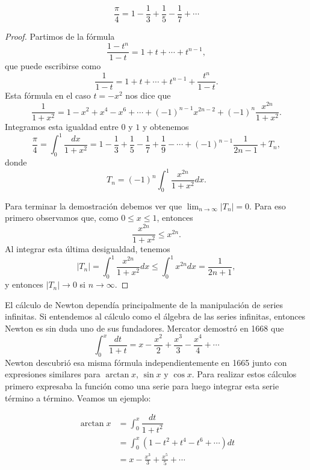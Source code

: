 \begin{theorem}[Leibniz]
	\[
	\frac{\pi}{4}=1-\frac13+\frac15-\frac17+\cdots
	\]
\end{theorem}

\begin{proof}
	Partimos de la fórmula 
	\[
		\frac{1-t^n}{1-t}=1+t+\cdots+t^{n-1},
	\]
	que puede escribirse como
	\[
		\frac{1}{1-t}=1+t+\cdots+t^{n-1}+\frac{t^n}{1-t}.
	\]
	Esta fórmula en el caso $t=-x^2$ nos dice que 
	\[
		\frac{1}{1+x^2}=1-x^2+x^4-x^6+\cdots+(-1)^{n-1}x^{2n-2}+(-1)^n\frac{x^{2n}}{1+x^2}.
	\]
	Integramos esta igualdad entre $0$ y $1$ y obtenemos
	\[
		\frac{\pi}{4}=\int_0^1\frac{dx}{1+x^2}=1-\frac13+\frac15-\frac17+\frac19-\cdots+(-1)^{n-1}\frac{1}{2n-1}+T_n,
	\]
	donde 
	\[
		T_n=(-1)^n\int_0^1\frac{x^{2n}}{1+x^2}dx.
	\]

	Para terminar la demostración debemos ver que 
	$\displaystyle{\lim_{n\to\infty}|T_n|=0}$. Para eso primero
	observamos que, como $0\leq x\leq 1$, entonces 
	\[
		\frac{x^{2n}}{1+x^2}\leq x^{2n}.
	\]
	Al integrar esta última desigualdad, tenemos
	\[
		|T_n|=\int_0^1\frac{x^{2n}}{1+x^2}dx\leq\int_0^1x^{2n}dx=\frac{1}{2n+1},
	\]
	y entonces $|T_n|\to 0$ si $n\to\infty$. 
\end{proof}

El cálculo de Newton dependía principalmente de la manipulación de series
infinitas. Si entendemos al cálculo como el álgebra de las series infinitas,
entonces Newton es sin duda uno de sus fundadores.  Mercator demostró en 1668
que 
\[
	\int_0^x\dfrac{dt}{1+t}=x-\frac{x^2}{2}+\frac{x^3}{3}-\frac{x^4}{4}+\cdots
\]
Newton descubrió esa misma fórmula independientemente en 1665 junto con
expresiones similares para $\arctan x$, $\sin x$ y $\cos x$.  Para realizar
estos cálculos primero expresaba la función como una serie para luego integrar
esta serie término a término. Veamos un ejemplo:

\begin{align*}
	\arctan x&=\int_0^x \dfrac{dt}{1+t^2}\\
	&=\int_0^x(1-t^2+t^4-t^6+\cdots)dt\\
	&=x-\frac{x^3}{3}+\frac{x^5}{5}+\cdots
\end{align*}


